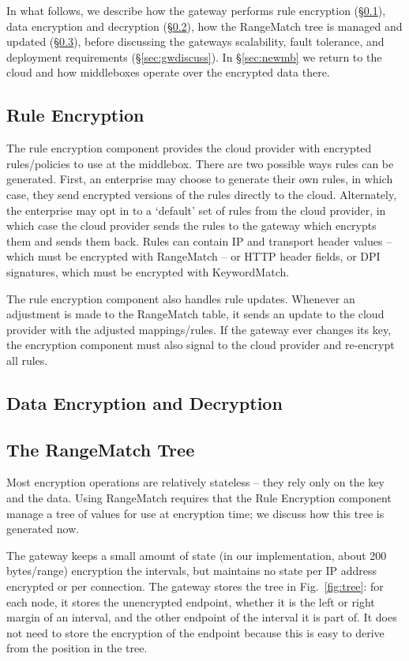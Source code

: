 In what follows, we describe how the gateway performs rule encryption (\S\ref{sec:rulenc}), data encryption and decryption (\S\ref{sec:dataenc}), how the RangeMatch tree is managed and updated (\S\ref{sec:tree}), before discussing the gateways scalability, fault tolerance, and deployment requirements (\S\ref{sec:gwdiscuss}).
In \S\ref{sec:newmb} we return to the cloud and how middleboxes operate over the encrypted data there.

\subsection{Rule Encryption}
\label{sec:rulenc}


The rule encryption component provides the cloud provider with encrypted rules/policies to use at the middlebox. 
There are two possible ways rules can be generated. First, an enterprise may choose to generate their own rules, in which case, they send encrypted versions of the rules directly to the cloud.
Alternately, the enterprise may opt in to a `default' set of rules from the cloud provider, in which case the cloud provider sends the rules to the gateway which encrypts them and sends them back.
Rules can contain IP and transport header values -- which must be encrypted with RangeMatch -- or HTTP header fields, or DPI signatures, which must be encrypted with KeywordMatch.

The rule encryption component also handles rule updates. 
Whenever an adjustment is made to the RangeMatch table, it sends an update to the cloud provider with the adjusted mappings/rules.
If the gateway ever changes its key, the encryption component must also signal to the cloud provider and re-encrypt all rules.

\subsection{Data Encryption and Decryption}
\label{sec:dataenc}
\subsection{The RangeMatch Tree}
\label{sec:tree}
Most encryption operations are relatively stateless -- they rely only on the key and the data. Using RangeMatch requires that the Rule Encryption component manage a tree of values for use at encryption time; we discuss how this tree is generated now.

The gateway keeps a small amount of state (in our implementation, about 200 bytes/range) encryption the intervals, but maintains no state per IP address encrypted or per connection. The gateway stores the tree in Fig.~\ref{fig:tree}: for each node, it stores the unencrypted endpoint, whether it is the left or  right margin of an interval, and the other endpoint of the interval it is part of. It does not need to store the encryption of the endpoint because this is easy to derive from the position in the tree. 



